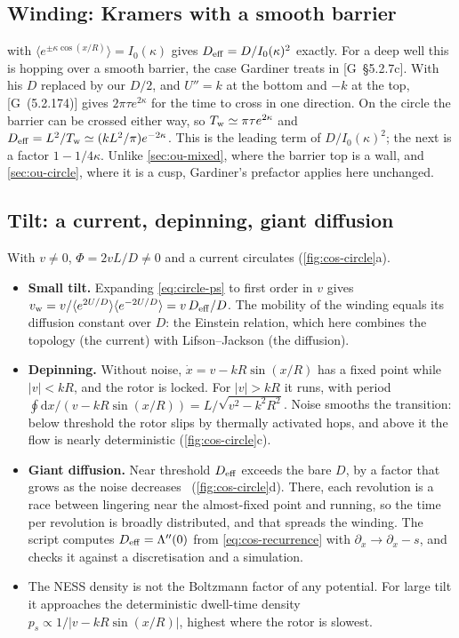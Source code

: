\documentclass[11pt]{article}
\numberwithin{equation}{section}
\newcommand{\dd}{\mathrm{d}}
\newcommand{\avg}[1]{\langle #1\rangle}
\newcommand{\G}[1]{[G~(#1)]}
\newcommand{\Gs}[1]{[G~\S#1]}
\begin{document}
\subsection{Winding: Kramers with a smooth barrier}

 with $\avg{e^{\pm\kappa\cos(x/R)}}=I_0(\kappa)$ gives $D_{\rm eff}=D/I_0(\kappa)^2$ exactly. For a
deep well this is hopping over a smooth barrier, the case Gardiner treats in \Gs{5.2.7c}. With his $D$ replaced
by our $D/2$, and $U''=k$ at the bottom and $-k$ at the top, \G{5.2.174} gives $2\pi\tau e^{2\kappa}$ for the
time to cross in one direction. On the circle the barrier can be crossed either way, so
$T_{\rm w}\simeq\pi\tau e^{2\kappa}$ and $D_{\rm eff}=L^2/T_{\rm w}\simeq(kL^2/\pi)e^{-2\kappa}$. This is the
leading term of $D/I_0(\kappa)^2$; the next is a factor $1-1/4\kappa$. Unlike \cref{sec:ou-mixed}, where the
barrier top is a wall, and \cref{sec:ou-circle}, where it is a cusp, Gardiner's prefactor applies here
unchanged.

\subsection{Tilt: a current, depinning, giant diffusion}

With $v\neq0$, $\Phi=2vL/D\neq0$ and a current circulates (\cref{fig:cos-circle}a).
\begin{itemize}
  \item \textbf{Small tilt.} Expanding \cref{eq:circle-ps} to first order in $v$ gives
        $v_{\rm w}=v/\avg{e^{2U/D}}\avg{e^{-2U/D}}=v\,D_{\rm eff}/D$. The mobility of the winding equals its diffusion
        constant over $D$: the Einstein relation, which here combines the topology (the current) with
        Lifson--Jackson (the diffusion).
  \item \textbf{Depinning.} Without noise, $\dot x=v-kR\sin(x/R)$ has a fixed point while $|v|<kR$, and the
        rotor is locked. For $|v|>kR$ it runs, with period $\oint\dd x/(v-kR\sin(x/R))=L/\sqrt{v^2-k^2R^2}$.
        Noise smooths the transition: below threshold the rotor slips by thermally activated hops, and above
        it the flow is nearly deterministic (\cref{fig:cos-circle}c).
  \item \textbf{Giant diffusion.} Near threshold $D_{\rm eff}$ exceeds the bare $D$, by a factor that grows as
        the noise decreases~\cite{reimann} (\cref{fig:cos-circle}d). There, each revolution is a race between
        lingering near the almost-fixed point and running, so the time per revolution is broadly distributed,
        and that spreads the winding. The script computes $D_{\rm eff}=\Lambda''(0)$ from
        \cref{eq:cos-recurrence} with $\partial_x\to\partial_x-s$, and checks it against a discretisation and a
        simulation.
  \item The NESS density is not the Boltzmann factor of any potential. For large tilt it approaches the
        deterministic dwell-time density $p_s\propto1/|v-kR\sin(x/R)|$, highest where the rotor is slowest.
\end{itemize}
\end{document}
